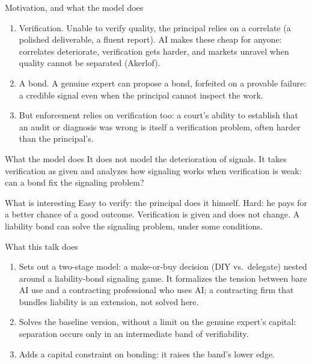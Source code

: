 \documentclass[11pt,aspectratio=169]{beamer}
\begin{document}
\begin{frame}{Motivation, and what the model does}
\footnotesize
\begin{enumerate}
  \item \alert{Verification.} Unable to verify quality, the principal relies on a correlate (a polished deliverable, a fluent report). AI makes these cheap for anyone: correlates deteriorate, verification gets harder, and markets unravel when quality cannot be separated (Akerlof).
  \item \alert{A bond.} A genuine expert can propose a bond, forfeited on a provable failure: a credible signal even when the principal cannot inspect the work.
  \item \alert{But} enforcement relies on verification too: a court's ability to establish that an audit or diagnosis was wrong is itself a verification problem, often harder than the principal's.
\end{enumerate}
\vfill
\begin{block}{What the model does}
It does not model the deterioration of signals. It takes verification as given and analyzes how signaling works when verification is weak: can a bond fix the signaling problem?
\end{block}
\begin{alertblock}{What is interesting}
Easy to verify: the principal does it himself. Hard: he pays for a better chance of a good outcome. Verification is given and does not change. A liability bond can solve the signaling problem, under some conditions.
\end{alertblock}
\end{frame}

\begin{frame}{What this talk does}
\begin{enumerate}
  \item Sets out a two-stage model: a make-or-buy decision (DIY vs.\ delegate) nested around a liability-bond signaling game. It formalizes the tension between bare AI use and a contracting professional who uses AI; a contracting firm that bundles liability is an extension, not solved here.
  \item Solves the \alert{baseline} version, without a limit on the genuine expert's capital: separation occurs only in an intermediate \alert{band} of verifiability.
  \item Adds a \alert{capital constraint} on bonding: it raises the band's lower edge.
\end{enumerate}
\end{frame}
\end{document}
